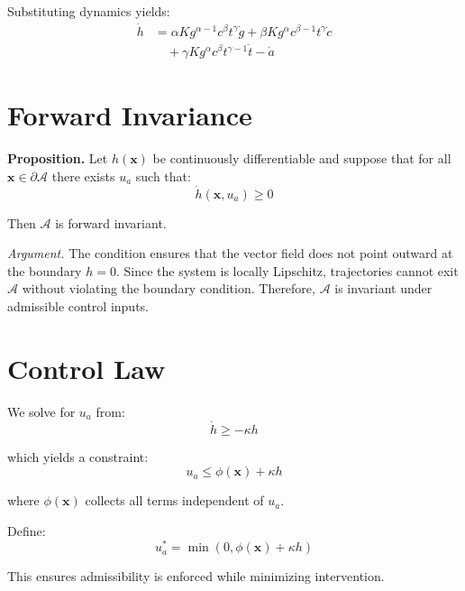 \documentclass[letterpaper, 10 pt, conference]{ieeeconf}
\begin{document}
Substituting dynamics yields:
\begin{align}
\dot{h} &= \alpha K g^{\alpha-1} c^\beta t^\gamma \dot{g}
+ \beta K g^\alpha c^{\beta-1} t^\gamma \dot{c} \nonumber \\
&\quad + \gamma K g^\alpha c^\beta t^{\gamma-1} \dot{t}
- \dot{a}
\end{align}

\section{Forward Invariance}

\textbf{Proposition.} Let $h(\mathbf{x})$ be continuously differentiable and suppose that for all $\mathbf{x} \in \partial \mathcal{A}$ there exists $u_a$ such that:
\begin{equation}
\dot{h}(\mathbf{x}, u_a) \ge 0
\end{equation}

Then $\mathcal{A}$ is forward invariant.

\textit{Argument.} The condition ensures that the vector field does not point outward at the boundary $h=0$. Since the system is locally Lipschitz, trajectories cannot exit $\mathcal{A}$ without violating the boundary condition. Therefore, $\mathcal{A}$ is invariant under admissible control inputs.

\section{Control Law}

We solve for $u_a$ from:
\begin{equation}
\dot{h} \ge -\kappa h
\end{equation}

which yields a constraint:
\begin{equation}
u_a \le \phi(\mathbf{x}) + \kappa h
\end{equation}

where $\phi(\mathbf{x})$ collects all terms independent of $u_a$.

Define:
\begin{equation}
u_a^* = \min(0, \phi(\mathbf{x}) + \kappa h)
\end{equation}

This ensures admissibility is enforced while minimizing intervention.
\end{document}
